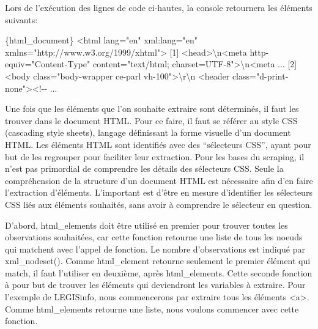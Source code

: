 \documentclass[
  letterpaper,
  DIV=11,
  numbers=noendperiod]{scrreprt}
\newenvironment{Shaded}{\begin{snugshade}}{\end{snugshade}}
\newcommand{\DataTypeTok}[1]{\textcolor[rgb]{0.68,0.00,0.00}{#1}}
\newcommand{\ExtensionTok}[1]{\textcolor[rgb]{0.00,0.23,0.31}{#1}}
\newcommand{\NormalTok}[1]{\textcolor[rgb]{0.00,0.23,0.31}{#1}}
\newcommand{\OperatorTok}[1]{\textcolor[rgb]{0.37,0.37,0.37}{#1}}
\newcommand{\StringTok}[1]{\textcolor[rgb]{0.13,0.47,0.30}{#1}}
\newcommand{\VariableTok}[1]{\textcolor[rgb]{0.07,0.07,0.07}{#1}}
\begin{document}
Lors de l'exécution des lignes de code ci-hautes, la console retournera
les éléments suivants:

\begin{Shaded}
\begin{Highlighting}[]
\ExtensionTok{\{html\_document\}}
\OperatorTok{\textless{}}\NormalTok{html }\VariableTok{lang}\OperatorTok{=}\StringTok{"en"} \ExtensionTok{xml:lang=}\StringTok{"en"}\NormalTok{ xmlns=}\StringTok{"http://www.w3.org/1999/xhtml"}\OperatorTok{\textgreater{}}
\ExtensionTok{[1]} \OperatorTok{\textless{}}\NormalTok{head}\OperatorTok{\textgreater{}}\DataTypeTok{\textbackslash{}n}\OperatorTok{\textless{}}\NormalTok{meta http{-}equiv=}\StringTok{"Content{-}Type"}\NormalTok{ content=}\StringTok{"text/html;         charset=UTF{-}8"}\OperatorTok{\textgreater{}}\DataTypeTok{\textbackslash{}n}\OperatorTok{\textless{}}\NormalTok{meta  ...}
\ExtensionTok{[2]} \OperatorTok{\textless{}}\NormalTok{body class=}\StringTok{"body{-}wrapper ce{-}parl vh{-}100"}\OperatorTok{\textgreater{}}\DataTypeTok{\textbackslash{}r\textbackslash{}n}    \OperatorTok{\textless{}}\NormalTok{header class=}\StringTok{"d{-}print{-}none"}\OperatorTok{\textgreater{}\textless{}}\NormalTok{!{-}{-} ...}
\end{Highlighting}
\end{Shaded}

Une fois que les éléments que l'on souhaite extraire sont déterminés, il
faut les trouver dans le document HTML. Pour ce faire, il faut se
référer au style CSS (cascading style sheets), langage définissant la
forme visuelle d'un document HTML. Les éléments HTML sont identifiés
avec des ``sélecteurs CSS'', ayant pour but de les regrouper pour
faciliter leur extraction. Pour les bases du scraping, il n'est pas
primordial de comprendre les détails des sélecteurs CSS. Seule la
compréhension de la structure d'un document HTML est nécessaire afin
d'en faire l'extraction d'éléments. L'important est d'être en mesure
d'identifier les sélecteurs CSS liés aux éléments souhaités, sans avoir
à comprendre le sélecteur en question.

D'abord, html\_elements doit être utilisé en premier pour trouver toutes
les observations souhaitées, car cette fonction retourne une liste de
tous les noeuds qui matchent avec l'appel de fonction. Le nombre
d'observations est indiqué par xml\_nodeset(). Comme html\_element
retourne seulement le premier élément qui match, il faut l'utiliser en
deuxième, après html\_elements. Cette seconde fonction à pour but de
trouver les éléments qui deviendront les variables à extraire. Pour
l'exemple de LEGISinfo, nous commencerons par extraire tous les éléments
\textless a\textgreater. Comme html\_elements retourne une liste, nous
voulons commencer avec cette fonction.
\end{document}
